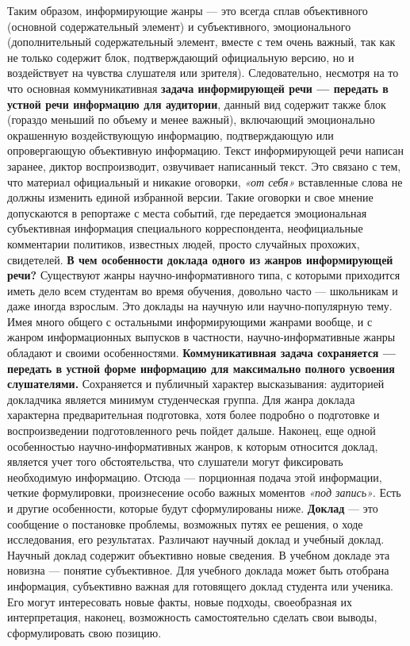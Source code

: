 {{Таким образом, информирующие жанры — это всегда сплав объективного (основной содержательный элемент) и субъективного, эмоционального (дополнительный содержательный элемент, вместе с тем очень важный, так как не только содержит блок, подтверждающий официальную версию, но и воздействует на чувства слушателя или зрителя). Следовательно, несмотря на то что основная коммуникативная \textbf{задача информирующей речи — передать в устной речи информацию для аудитории}, данный вид содержит также блок (гораздо меньший по объему и менее важный), включающий эмоционально окрашенную воздействующую информацию, подтверждающую или опровергающую объективную информацию. Текст информирующей речи написан заранее, диктор воспроизводит, озвучивает написанный текст. Это связано с тем, что материал официальный и никакие оговорки, \textit{«от себя»} вставленные слова не должны изменить единой избранной версии. Такие оговорки и свое мнение допускаются в репортаже с места событий, где передается эмоциональная субъективная информация специального корреспондента, неофициальные комментарии политиков, известных людей, просто случайных прохожих, свидетелей. 
\textbf{В чем особенности доклада одного из жанров информирующей речи?}
Существуют жанры научно-информативного типа, с которыми приходится иметь дело всем студентам во время обучения, довольно часто — школьникам и даже иногда взрослым. Это доклады на научную или научно-популярную тему. Имея много общего с остальными информирующими жанрами вообще, и с жанром информационных выпусков в частности, научно-информативные жанры обладают и своими особенностями. \textbf{Коммуникативная задача сохраняется — передать в устной форме информацию для максимально полного усвоения слушателями.} Сохраняется и публичный характер высказывания: аудиторией докладчика является минимум студенческая группа. Для жанра доклада характерна предварительная подготовка, хотя более подробно о подготовке и воспроизведении подготовленного речь пойдет дальше. Наконец, еще одной особенностью научно-информативных жанров, к которым относится доклад, является учет того обстоятельства, что слушатели могут фиксировать необходимую информацию. Отсюда — порционная подача этой информации, четкие формулировки, произнесение особо важных моментов \textit{«под запись»}. Есть и другие особенности, которые будут сформулированы ниже.
\textbf{Доклад }— это сообщение о постановке проблемы, возможных путях ее решения, о ходе исследования, его результатах. Различают научный доклад и учебный доклад. Научный доклад содержит объективно новые сведения. В учебном докладе эта новизна — понятие субъективное. Для учебного доклада может быть отобрана информация, субъективно важная для готовящего доклад студента или ученика. Его могут интересовать новые факты, новые подходы, своеобразная их интерпретация, наконец, возможность самостоятельно сделать свои выводы, сформулировать свою позицию.
}}
